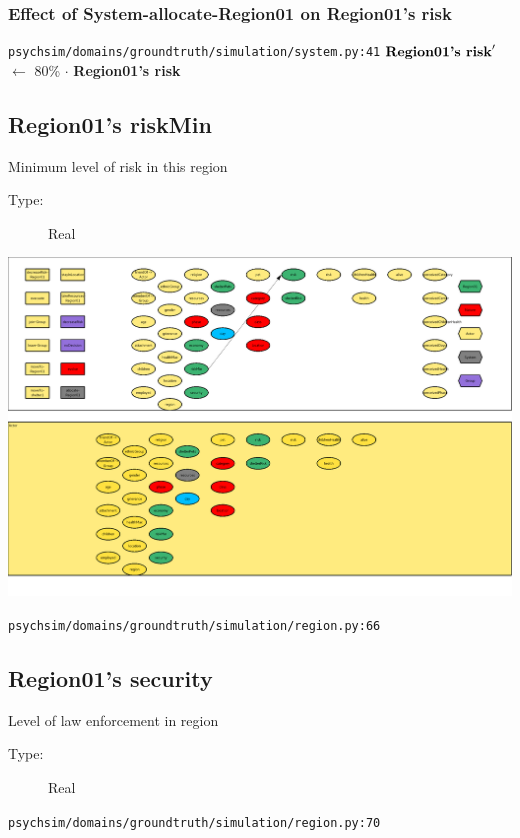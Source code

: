 \documentclass{article}%
\begin{document}
%
\subsubsection{Effect of System{-}allocate{-}Region01 on Region01's risk}%
\label{ssubsec:Effect of System{-}allocate{-}Region01 on Region01's risk}%
\begin{flushleft}%
\verb|psychsim/domains/groundtruth/simulation/system.py:41|%
\linebreak%
$\mbox{\textbf{Region01's risk}} '$%
$\leftarrow$%
80\%%
$\cdot$%
\textbf{Region01's risk}%
\end{flushleft}

%
\subsection{Region01's riskMin}%
\label{subsec:Region01's riskMin}%
Minimum level of risk in this region%
\begin{description}%
\item[Type:]%
Real%
\end{description}%
\includegraphics[width=\textwidth]{images/riskMinOfRegion01.png}%
\begin{flushleft}%
\verb|psychsim/domains/groundtruth/simulation/region.py:66|%
\end{flushleft}

%
\subsection{Region01's security}%
\label{subsec:Region01's security}%
Level of law enforcement in region%
\begin{description}%
\item[Type:]%
Real%
\end{description}%
\begin{flushleft}%
\verb|psychsim/domains/groundtruth/simulation/region.py:70|%
\end{flushleft}
\end{document}

